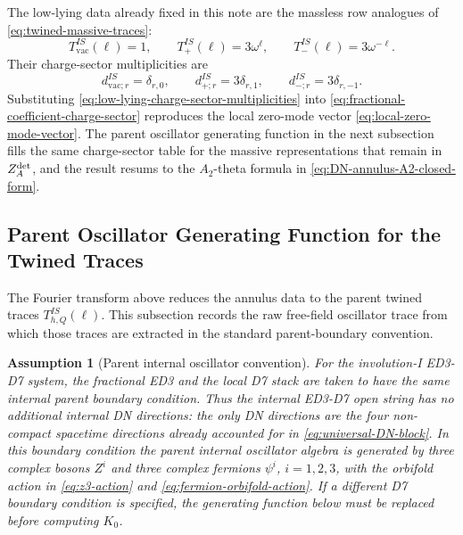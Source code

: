 \documentclass[11pt]{article}
\newcommand{\vac}{\mathrm{vac}}
\newtheorem{assumption}{Assumption}
\begin{document}
The low-lying data already fixed in this note are the massless row analogues of
\eqref{eq:twined-massive-traces}:
\begin{equation}
  T_{\vac}^{IS}(\ell)=1,
  \qquad
  T_{+}^{IS}(\ell)=3\omega^\ell,
  \qquad
  T_{-}^{IS}(\ell)=3\omega^{-\ell}.
  \label{eq:low-lying-twined-row-traces}
\end{equation}
Their charge-sector multiplicities are
\begin{equation}
  d_{\vac;r}^{IS}=\delta_{r,0},
  \qquad
  d_{+;r}^{IS}=3\delta_{r,1},
  \qquad
  d_{-;r}^{IS}=3\delta_{r,-1}.
  \label{eq:low-lying-charge-sector-multiplicities}
\end{equation}
Substituting \eqref{eq:low-lying-charge-sector-multiplicities} into
\eqref{eq:fractional-coefficient-charge-sector} reproduces the local zero-mode vector
\eqref{eq:local-zero-mode-vector}. The parent oscillator generating function in the next
subsection fills the same charge-sector table for the massive representations that remain in
\(Z_A^{\rm det}\), and the result resums to the \(A_2\)-theta formula in
\eqref{eq:DN-annulus-A2-closed-form}.

\subsection{Parent Oscillator Generating Function for the Twined Traces}

The Fourier transform above reduces the annulus data to the parent twined traces
\(T_{h,Q}^{IS}(\ell)\). This subsection records the raw free-field oscillator trace from which
those traces are extracted in the standard parent-boundary convention.

\begin{assumption}[Parent internal oscillator convention]
For the involution-I ED3-D7 system, the fractional ED3 and the local D7 stack are taken to have
the same internal parent boundary condition. Thus the internal ED3-D7 open string has no
additional internal DN directions: the only DN directions are the four non-compact spacetime
directions already accounted for in \eqref{eq:universal-DN-block}. In this boundary condition the parent
internal oscillator algebra is generated by three complex bosons \(Z^i\) and three complex
fermions \(\psi^i\), \(i=1,2,3\), with the orbifold action in \eqref{eq:z3-action} and
\eqref{eq:fermion-orbifold-action}. If a different D7 boundary condition is specified, the
generating function below must be replaced before computing \(K_0\).
\label{assumption:parent-oscillator-convention}
\end{assumption}
\end{document}
